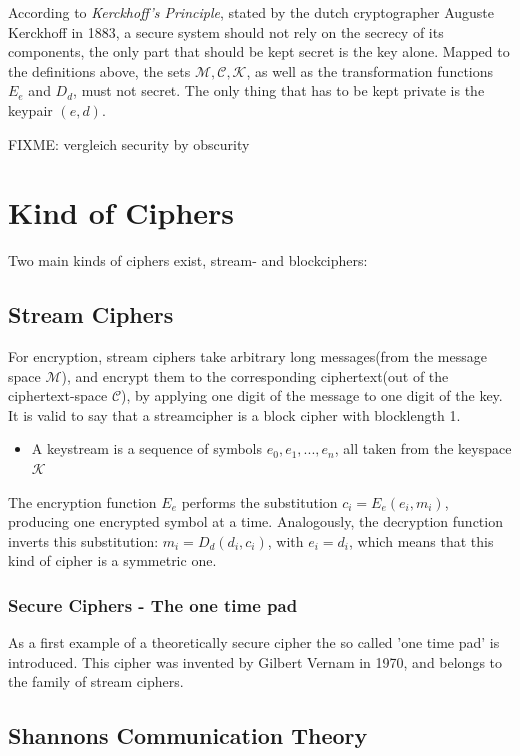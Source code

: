 According to \textit{Kerckhoff's Principle}, stated by the dutch cryptographer Auguste Kerckhoff in 1883, a secure system should not rely on the secrecy of
its components, the only part that should be kept secret is the key alone. Mapped to the definitions above, the sets $\mathcal{M, C, K}$, as well as the
transformation functions $E_e$ and $D_d$, must not secret. The only thing that has to be kept private is the keypair $(e, d)$.

FIXME: vergleich security by obscurity

\section{Kind of Ciphers}

Two main kinds of ciphers exist, stream- and blockciphers:

\subsection{Stream Ciphers}

For encryption, stream ciphers take arbitrary long messages(from the message space $\mathcal{M}$), and encrypt
them to the corresponding ciphertext(out of the ciphertext-space $\mathcal{C}$), by applying
one digit of the message to one digit of the key. It is valid to say that a streamcipher is a block cipher with blocklength 1.

\begin{itemize}
 \item A keystream is a sequence of symbols $e_0, e_1, ..., e_n$, all taken from the keyspace $\mathcal{K}$
\end{itemize}

The encryption function $E_e$ performs the substitution $c_i = E_e(e_i, m_i)$, producing one encrypted symbol at a time. Analogously,
the decryption function inverts this substitution: $m_i = D_d(d_i, c_i)$, with $e_i = d_i$, which means that this kind of cipher is a
symmetric one.

\subsubsection{Secure Ciphers - The one time pad}

As a first example of a theoretically secure cipher the so called 'one time pad' is introduced. This cipher was invented
by Gilbert Vernam in 1970, and belongs to the family of stream ciphers. 


\subsection{Shannons Communication Theory}

